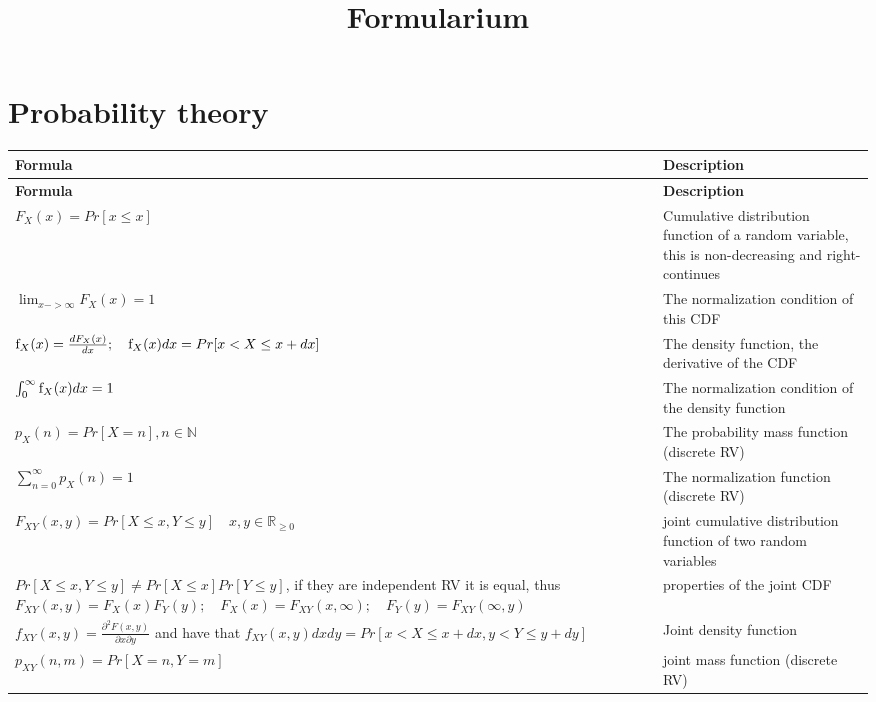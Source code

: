 \documentclass{article}
\title{Formularium}
\author{}
\date{}
\begin{document}
\maketitle

\section{Probability theory}
\renewcommand{\arraystretch}{2} %
\setlength{\tabcolsep}{8pt}
\begin{longtable}{| p{7cm} | p{8cm} |}
    \hline
    \textbf{Formula} & \textbf{Description} \\ \hline
    \endfirsthead
    \hline
    \textbf{Formula} & \textbf{Description} \\ \hline
    \endhead
    \hline
    \endfoot
    $F_X(x)= Pr[x \le x]$ & Cumulative distribution function of a random variable, this is non-decreasing and right-continues \\
    \hline
    $\lim_{x -> \infty} F_X(x) = 1$ & The normalization condition of this CDF \\
    \hline
    $\textnormal{f}_X(x) = \frac{dF_X(x)}{dx} ;\quad \textnormal{f}_X(x)dx = Pr[x < X \le x +dx]$ & The density function, the derivative of the CDF \\
    \hline
    $\int_{0}^{\infty}\textnormal{f}_X(x)dx = 1$ & The normalization condition of the density function \\
    \hline
    $ p_X(n) = Pr[X = n], n \in \mathbb{N} $ & The probability mass function (discrete RV) \\
    \hline
    $ \sum_{n=0}^{\infty} p_X(n) = 1 $ & The normalization function (discrete RV) \\
    \hline
    $ F_{XY}(x,y) = Pr[X \le x, Y \le y] \quad x, y \in \mathbb{R}_{\ge 0} $ & joint cumulative distribution function of two random variables \\
    \hline
    $ Pr[X \le x, Y \le y] \ne Pr[X \le x] Pr[Y \le y]$, if they are independent RV it is equal, thus $ F_{XY}(x, y) = F_X(x)F_Y(y) ;\quad F_X(x) = F_{XY}(x,\infty);\quad F_Y(y) = F_{XY}(\infty, y) $ & properties of the joint CDF \\
    \hline
    $ f_{XY}(x,y) = \frac{\partial^2 F(x, y)}{\partial x \partial y} $ and have that $ f_{XY}(x,y)dxdy = Pr[x < X \le x +dx, y< Y \le y + dy] $ & Joint density function \\
    \hline
    $ p_{XY} (n,m) = Pr[X = n, Y = m] $ & joint mass function (discrete RV) \\

\end{longtable}
\end{document}
